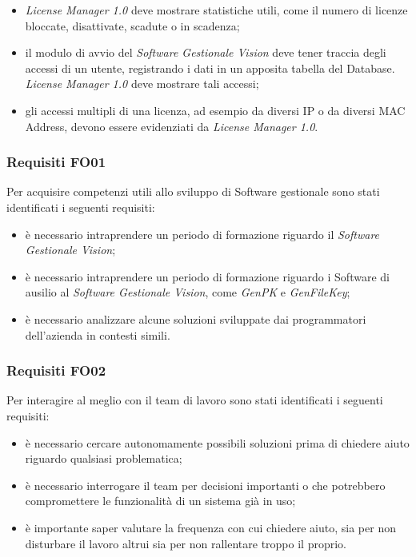 \begin{itemize}

\item \textit{License Manager 1.0} deve mostrare statistiche utili, come il numero di licenze bloccate, disattivate, scadute o in scadenza;
\item il modulo di avvio del \textit{Software Gestionale Vision} deve tener traccia degli accessi di un utente, registrando i dati in un apposita tabella del Database. \textit{License Manager 1.0} deve mostrare tali accessi;
\item gli accessi multipli di una licenza, ad esempio da diversi IP o da diversi MAC Address, devono essere evidenziati da \textit{License Manager 1.0}.

\end{itemize}
\subsubsection{Requisiti FO01}

Per acquisire competenzi utili allo sviluppo di Software gestionale sono stati identificati i seguenti requisiti:

\begin{itemize}
\item è necessario intraprendere un periodo di formazione riguardo il \textit{Software Gestionale Vision};
\item è necessario intraprendere un periodo di formazione riguardo i Software di ausilio al \textit{Software Gestionale Vision}, come \textit{GenPK} e \textit{GenFileKey};
\item è necessario analizzare alcune soluzioni sviluppate dai programmatori dell'azienda in contesti simili.
\end{itemize}

\subsubsection{Requisiti FO02}

Per interagire al meglio con il team di lavoro sono stati identificati i seguenti requisiti:

\begin{itemize}
\item è necessario cercare autonomamente possibili soluzioni prima di chiedere aiuto riguardo qualsiasi problematica;
\item è necessario interrogare il team per decisioni importanti o che potrebbero compromettere le funzionalità di un sistema già in uso;
\item è importante saper valutare la frequenza con cui chiedere aiuto, sia per non disturbare il lavoro altrui sia per non rallentare troppo il proprio.
\end{itemize}

